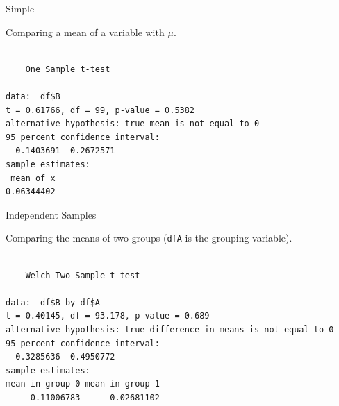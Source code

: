 \begin{frame}[fragile]{Simple}

\center
Comparing a mean of a variable with \(\mu\).

\begin{Shaded}
\begin{Highlighting}[]
\OperatorTok{$} \NormalTok{)}
\end{Highlighting}
\end{Shaded}

\begin{verbatim}

    One Sample t-test

data:  df$B
t = 0.61766, df = 99, p-value = 0.5382
alternative hypothesis: true mean is not equal to 0
95 percent confidence interval:
 -0.1403691  0.2672571
sample estimates:
 mean of x 
0.06344402 
\end{verbatim}

\end{frame}

\begin{frame}[fragile]{Independent Samples}

\center
Comparing the means of two groups (\texttt{dfA} is the grouping
variable).

\begin{Shaded}
\begin{Highlighting}[]
\OperatorTok{$}\OperatorTok{~}\StringTok{ }\OperatorTok{$}
\end{Highlighting}
\end{Shaded}

\begin{verbatim}

    Welch Two Sample t-test

data:  df$B by df$A
t = 0.40145, df = 93.178, p-value = 0.689
alternative hypothesis: true difference in means is not equal to 0
95 percent confidence interval:
 -0.3285636  0.4950772
sample estimates:
mean in group 0 mean in group 1 
     0.11006783      0.02681102 
\end{verbatim}

\end{frame}

